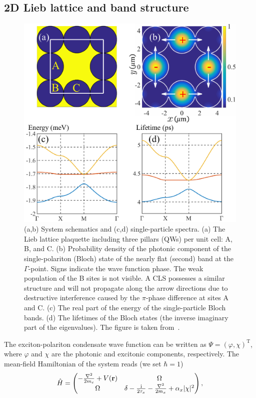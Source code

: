 %
%
\subsection{2D Lieb lattice and band structure}
%
%
%
\begin{figure}[ht]
\centering
\includegraphics[width=0.6\linewidth]{Fig/Ch3/pic1.pdf}
\caption[Lieb lattice and corresponding spectrum]{(a,b) System schematics and (c,d) single-particle spectra.
(a) The Lieb lattice plaquette including three pillars (QWs) per unit cell: A, B, and C.
(b) Probability density of the photonic component of the single-polariton (Bloch) state of the nearly flat (second) band at the $\Gamma$-point.
Signs indicate the wave function phase. The weak population of the B sites is not visible.
A CLS possesses a similar structure and will not propagate along the arrow directions due to destructive interference caused by the $\pi$-phase difference at sites A and C.
(c) The real part of the energy of the single-particle Bloch bands.
(d) The lifetimes of the Bloch states (the inverse imaginary part of the eigenvalues).
 The figure is taken from~\cite{Sun:2018aa}.}
\label{fig:CH3_1}
\end{figure}
%
%
%
The exciton-polariton condensate wave function can be written as $\Psi=(\varphi,\chi)^\mathrm{T}$, where $\varphi$ and $\chi$ are the photonic and excitonic components, respectively.
The mean-field Hamiltonian of the system reads (we set $\hbar=1$)
%
\begin{equation}
  \hat{H} =
  \begin{pmatrix}
  -\frac{\nabla^2}{2m_c}+V(\mathbf{r}) & \Omega \\
  \Omega & \delta -\frac{\mathrm{i}}{2\tau_x} -\frac{\nabla^2}{2m_x}+\alpha_x|\chi|^2
  \end{pmatrix},
  \label{CH3_Ham}
\end{equation}
